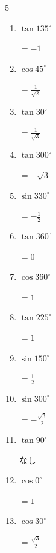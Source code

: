 \begin{multicols}{5}
\begin{enumerate}
        $\displaystyle =0$

  \item $\displaystyle \tan{135^\circ}$

        $\displaystyle =-1$

  \item $\displaystyle \cos{45^\circ}$

        $\displaystyle =\frac{1}{\sqrt{2}}$

\columnbreak %

  \item $\displaystyle \tan{30^\circ}$

        $\displaystyle =\frac{1}{\sqrt{3}}$

  \item $\displaystyle \tan{300^\circ}$

        $\displaystyle =-\sqrt{3}$

  \item $\displaystyle \sin{330^\circ}$

        $\displaystyle =-\frac{1}{2}$

  \item $\displaystyle \tan{360^\circ}$

        $\displaystyle =0$

  \item $\displaystyle \cos{360^\circ}$

        $\displaystyle =1$

  \item $\displaystyle \tan{225^\circ}$

        $\displaystyle =1$

  \item $\displaystyle \sin{150^\circ}$

        $\displaystyle =\frac{1}{2}$

  \item $\displaystyle \sin{300^\circ}$

        $\displaystyle =-\frac{\sqrt{3}}{2}$

  \item $\displaystyle \tan{90^\circ}$

        $\displaystyle なし$

  \item $\displaystyle \cos{0^\circ}$

        $\displaystyle =1$

  \item $\displaystyle \cos{30^\circ}$

        $\displaystyle =\frac{\sqrt{3}}{2}$


\end{enumerate}
\end{multicols}
